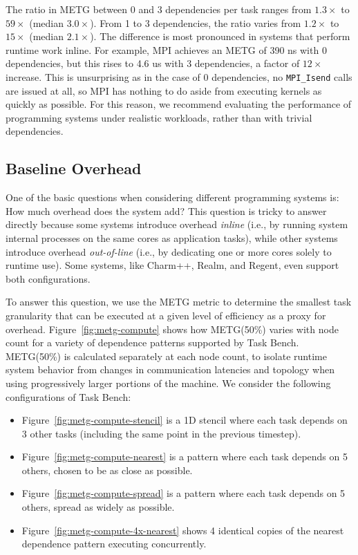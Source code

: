 The ratio in METG between 0 and 3 dependencies per task ranges from
$1.3\times$ to $59\times$ (median $3.0\times$). From 1 to 3
dependencies, the ratio varies from $1.2\times$ to $15\times$ (median
$2.1\times$). The difference is most pronounced in systems that
perform runtime work inline. For example, MPI achieves an METG of 390
ns with 0 dependencies, but this rises to 4.6 us with 3 dependencies,
a factor of $12\times$ increase. This is unsurprising as in the case
of 0 dependencies, no \lstinline[language=C++]{MPI_Isend} calls are
issued at all, so MPI has nothing to do aside from executing kernels
as quickly as possible. For this reason, we recommend evaluating the performance of
programming systems under realistic workloads, rather than with
trivial dependencies.

\subsection{Baseline Overhead}



One of the basic questions when considering different programming
systems is: How much overhead does the system add? This question is tricky to answer directly because some systems introduce
overhead \emph{inline} (i.e., by running system internal processes on
the same cores as application tasks), while other systems introduce
overhead \emph{out-of-line} (i.e., by dedicating one or more cores
solely to runtime use). Some systems, like Charm++, Realm, and Regent,
even support both configurations.

To answer this question, we use the METG metric to determine the
smallest task granularity that can be executed at a given level of
efficiency as a proxy for overhead. Figure~\ref{fig:metg-compute}
shows how METG(50\%) varies with node count for a variety of
dependence patterns supported by Task Bench. METG(50\%) is calculated
separately at each node count, to isolate runtime system behavior from
changes in communication latencies and topology when using
progressively larger portions of the machine. We consider the
following configurations of Task Bench:

\begin{itemize}
\item Figure~\ref{fig:metg-compute-stencil} is a 1D stencil where each
  task depends on 3 other tasks (including the same point in the
  previous timestep).
\item Figure~\ref{fig:metg-compute-nearest} is a pattern where each
  task depends on 5 others, chosen to be as close as possible.
\item Figure~\ref{fig:metg-compute-spread} is a pattern where each
  task depends on 5 others, spread as widely as possible.
\item Figure~\ref{fig:metg-compute-4x-nearest} shows 4 identical
  copies of the nearest dependence pattern executing concurrently.
\end{itemize}

